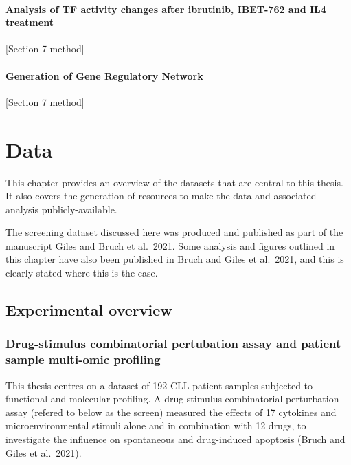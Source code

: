 \documentclass[11pt, a4paper, twosided]{book}
\begin{document}
\hypertarget{analysis-of-tf-activity-changes-after-ibrutinib-ibet-762-and-il4-treatment}{%
\subsubsection{Analysis of TF activity changes after ibrutinib, IBET-762 and IL4 treatment}\label{analysis-of-tf-activity-changes-after-ibrutinib-ibet-762-and-il4-treatment}}

{[}Section 7 method{]}

\hypertarget{generation-of-gene-regulatory-network}{%
\subsubsection{Generation of Gene Regulatory Network}\label{generation-of-gene-regulatory-network}}

{[}Section 7 method{]}

\hypertarget{data}{%
\chapter{Data}\label{data}}

This chapter provides an overview of the datasets that are central to this thesis. It also covers the generation of resources to make the data and associated analysis publicly-available.

The screening dataset discussed here was produced and published as part of the manuscript Giles and Bruch et al.~2021. Some analysis and figures outlined in this chapter have also been published in Bruch and Giles et al.~2021, and this is clearly stated where this is the case.

\hypertarget{experimental-overview}{%
\section{Experimental overview}\label{experimental-overview}}

\hypertarget{the-screen}{%
\subsection{Drug-stimulus combinatorial pertubation assay and patient sample multi-omic profiling}\label{the-screen}}

This thesis centres on a dataset of 192 CLL patient samples subjected to functional and molecular profiling. A drug-stimulus combinatorial perturbation assay (refered to below as the screen) measured the effects of 17 cytokines and microenvironmental stimuli alone and in combination with 12 drugs, to investigate the influence on spontaneous and drug-induced apoptosis (Bruch and Giles et al.~2021).
\end{document}
